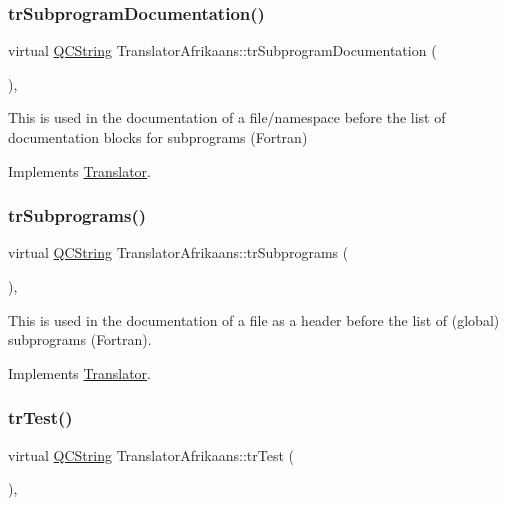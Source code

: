 \subsubsection{\texorpdfstring{trSubprogramDocumentation()}{trSubprogramDocumentation()}}
{\footnotesize\ttfamily virtual \mbox{\hyperlink{class_q_c_string}{Q\+C\+String}} Translator\+Afrikaans\+::tr\+Subprogram\+Documentation (\begin{DoxyParamCaption}{ }\end{DoxyParamCaption})\hspace{0.3cm}{\ttfamily [inline]}, {\ttfamily [virtual]}}

This is used in the documentation of a file/namespace before the list of documentation blocks for subprograms (Fortran) 

Implements \mbox{\hyperlink{class_translator}{Translator}}.

\mbox{\label{class_translator_afrikaans_adb737f090bb33f4ea1933709454b51f8}} 
\subsubsection{\texorpdfstring{trSubprograms()}{trSubprograms()}}
{\footnotesize\ttfamily virtual \mbox{\hyperlink{class_q_c_string}{Q\+C\+String}} Translator\+Afrikaans\+::tr\+Subprograms (\begin{DoxyParamCaption}{ }\end{DoxyParamCaption})\hspace{0.3cm}{\ttfamily [inline]}, {\ttfamily [virtual]}}

This is used in the documentation of a file as a header before the list of (global) subprograms (Fortran). 

Implements \mbox{\hyperlink{class_translator}{Translator}}.

\mbox{\label{class_translator_afrikaans_a3b86befb0341811fb3fcb751fdb0b45c}} 
\subsubsection{\texorpdfstring{trTest()}{trTest()}}
{\footnotesize\ttfamily virtual \mbox{\hyperlink{class_q_c_string}{Q\+C\+String}} Translator\+Afrikaans\+::tr\+Test (\begin{DoxyParamCaption}{ }\end{DoxyParamCaption})\hspace{0.3cm}{\ttfamily [inline]}, {\ttfamily [virtual]}}

